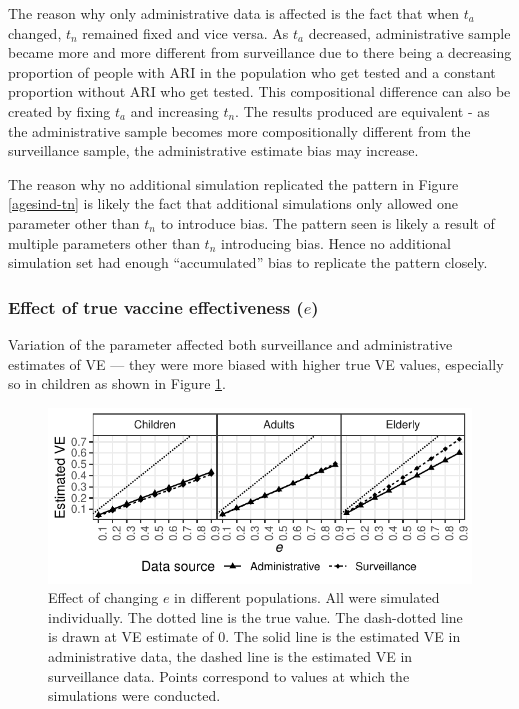 \documentclass[11pt]{article}
\begin{document}
\pagebreak

The reason why only administrative data is affected is the fact that when $t_a$ changed, $t_n$ remained fixed and vice versa. As $t_a$ decreased, administrative sample became more and more different from surveillance due to there being a decreasing proportion of people with ARI in the population who get tested and a constant proportion without ARI who get tested. This compositional difference can also be created by fixing $t_a$ and increasing $t_n$. The results produced are equivalent - as the administrative sample becomes more compositionally different from the surveillance sample, the administrative estimate bias may increase. 

The reason why no additional simulation replicated the pattern in Figure \ref{agesind-tn} is likely the fact that additional simulations only allowed one parameter other than $t_n$ to introduce bias. The pattern seen is likely a result of multiple parameters other than $t_n$ introducing bias. Hence no additional simulation set had enough ``accumulated'' bias to replicate the pattern closely.

\subsubsection{Effect of true vaccine effectiveness ($e$)}

Variation of the parameter affected both surveillance and administrative estimates of VE --- they were more biased with higher true VE values, especially so in children as shown in Figure \ref{agesind-ve}.

\begin{figure}[h]
	\centering
		\includegraphics[width=0.75\linewidth]{../fig-agesind/agesind-ve.pdf}
		\caption{
Effect of changing $e$ in different populations. All were simulated individually. The dotted line is the true value. The dash-dotted line is drawn at VE estimate of 0. The solid line is the estimated VE in administrative data, the dashed line is the estimated VE in surveillance data. Points correspond to values at which the simulations were conducted.  \label{agesind-ve}
		}
\end{figure}
\end{document}
